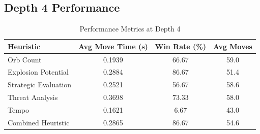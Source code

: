\documentclass[12pt]{article}
\begin{document}
\newpage
\subsection{Depth 4 Performance}
\begin{table}[h!]
  \centering
  \caption{Performance Metrics at Depth 4}
  \label{tab:metrics_depth4}
  \begin{tabular}{lccc}
    \toprule
    Heuristic                & Avg Move Time (s) & Win Rate (\%) & Avg Moves \\
    \midrule
    Orb Count                & 0.1939            & 66.67         & 59.0      \\
    Explosion Potential      & 0.2884            & 86.67         & 51.4      \\
    Strategic Evaluation     & 0.2521            & 56.67         & 58.6      \\
    Threat Analysis          & 0.3698            & 73.33         & 58.0      \\
    Tempo                    & 0.1621            &  6.67         & 43.0      \\
    Combined Heuristic       & 0.2865            & 86.67         & 54.6      \\
    \bottomrule
  \end{tabular}
\end{table}
\end{document}
